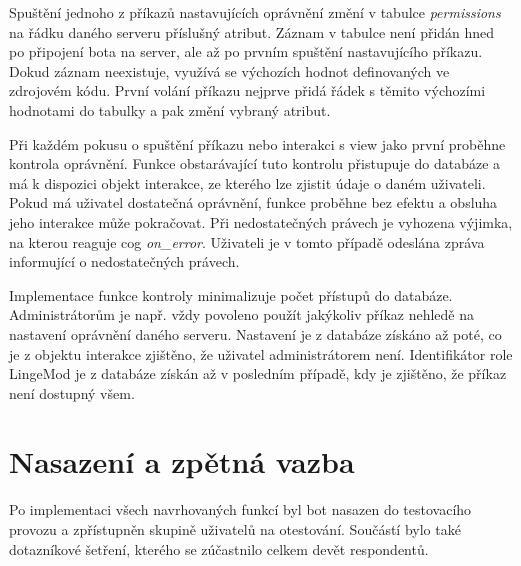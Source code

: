 \documentclass[FM]{tulthesis}
\begin{document}
	Spuštění jednoho z příkazů nastavujících oprávnění změní v tabulce \textit{permissions} na řádku daného serveru příslušný atribut. Záznam v tabulce není přidán hned po připojení bota na server, ale až po prvním spuštění nastavujícího příkazu. Dokud záznam neexistuje, využívá se výchozích hodnot definovaných ve zdrojovém kódu. První volání příkazu nejprve přidá řádek s těmito výchozími hodnotami do tabulky a pak změní vybraný atribut.
	
	Při každém pokusu o spuštění příkazu nebo interakci s view jako první proběhne kontrola oprávnění. Funkce obstarávající tuto kontrolu přistupuje do databáze a má k dispozici objekt interakce, ze kterého lze zjistit údaje o daném uživateli. Pokud má uživatel dostatečná oprávnění, funkce proběhne bez efektu a obsluha jeho interakce může pokračovat. Při nedostatečných právech je vyhozena výjimka, na kterou reaguje cog \textit{on\_error}. Uživateli je v tomto případě odeslána zpráva informující o nedostatečných právech.
	
	Implementace funkce kontroly minimalizuje počet přístupů do databáze. Administrátorům je např. vždy povoleno použít jakýkoliv příkaz nehledě na nastavení oprávnění daného serveru. Nastavení je z databáze získáno až poté, co je z objektu interakce zjištěno, že uživatel administrátorem není. Identifikátor role LingeMod je z databáze získán až v posledním případě, kdy je zjištěno, že příkaz není dostupný všem.
	
		
	\section{Nasazení a zpětná vazba}
	
	Po implementaci všech navrhovaných funkcí byl bot nasazen do testovacího provozu a zpřístupněn skupině uživatelů na otestování. Součástí bylo také dotazníkové šetření, kterého se zúčastnilo celkem devět respondentů.
	
	$ $%
	
\end{document}
